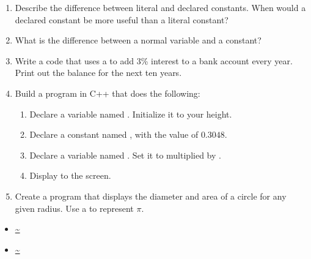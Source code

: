 
\begin{enumerate}
	\item Describe the difference between literal and declared constants. When would a declared constant be more useful than a literal constant?
	\item What is the difference between a normal variable and a constant?
	\item Write a code that uses a  to add 3\% interest to a bank account every year. Print out the balance for the next ten years.
	\item Build a program in C++ that does the following:
	
	\begin{enumerate}
		\item Declare a  variable named . Initialize it to your height.
		\item Declare a  constant named , with the value of $0.3048$.
		\item Declare a  variable named . Set it to  multiplied by .
		\item	Display  to the screen.
	\end{enumerate}

	\item Create a program that displays the diameter and area of a circle for any given radius. Use a  to represent $\pi$. 

\end{enumerate}


\begin{itemize}
\item \url{~}
\item \url{~}
\end{itemize}
